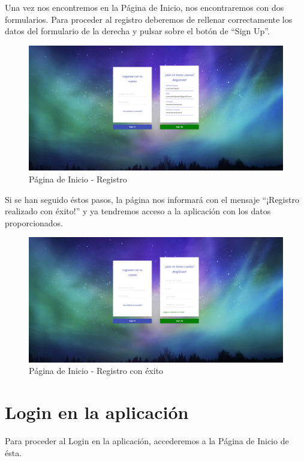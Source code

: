 \documentclass[11pt,openany]{book}
\begin{document}
Una vez nos encontremos en la Página de Inicio, nos encontraremos con dos formularios. Para proceder al registro deberemos de rellenar correctamente los datos del formulario de la derecha y pulsar sobre el botón de ``Sign Up''. 

\begin{figure}[H]
\centering
\includegraphics[totalheight=6cm]{manualUsuario/registro.png}
\caption{Página de Inicio - Registro}
\end{figure}

Si se han seguido éstos pasos, la página nos informará con el mensaje ``¡Registro realizado con éxito!'' y ya tendremos acceso a la aplicación con los datos proporcionados.

\begin{figure}[H]
\centering
\includegraphics[totalheight=6cm]{manualUsuario/registroConExito.png}
\caption{Página de Inicio - Registro con éxito}
\end{figure}

\section{Login en la aplicación}

Para proceder al Login en la aplicación, accederemos a la Página de Inicio de ésta.
\end{document}

